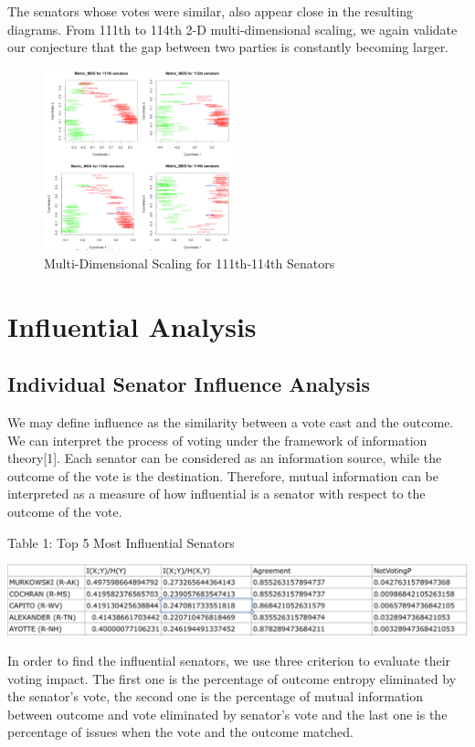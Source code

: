 \documentclass{article} %
\begin{document}
The senators whose votes were similar, also appear close in the resulting diagrams. From 111th to 114th 2-D multi-dimensional scaling, we again validate our conjecture that the gap between two parties is constantly becoming larger.
\begin{figure}[h]
\begin{center}
\includegraphics[width=0.5\textwidth]{fig3}
\end{center}
\caption{Multi-Dimensional Scaling for 111th-114th Senators}
\end{figure}
\section{Influential Analysis}
\subsection{Individual Senator Influence Analysis
}
We may define influence as the similarity between a vote cast and the outcome. We can interpret the process of voting under the framework of information theory[1]. Each senator can be considered as an information source, while the outcome of the vote is the destination. Therefore, mutual information can be interpreted as a measure of how influential is a senator with respect to the outcome of the vote.
\begin{center}Table 1: Top 5 Most Influential Senators
\end{center}
\includegraphics[width=1\textwidth]{table1}

In order to find the influential senators, we use three criterion to evaluate their voting impact. The first one is the percentage of outcome entropy eliminated by the senator's vote, the second one is the percentage of mutual information between outcome and vote eliminated by senator's vote and the last one is the percentage of issues when the vote and the outcome matched. 
\end{document}
